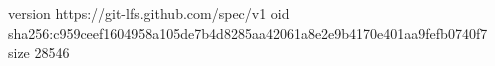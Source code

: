 version https://git-lfs.github.com/spec/v1
oid sha256:c959ceef1604958a105de7b4d8285aa42061a8e2e9b4170e401aa9fefb0740f7
size 28546
